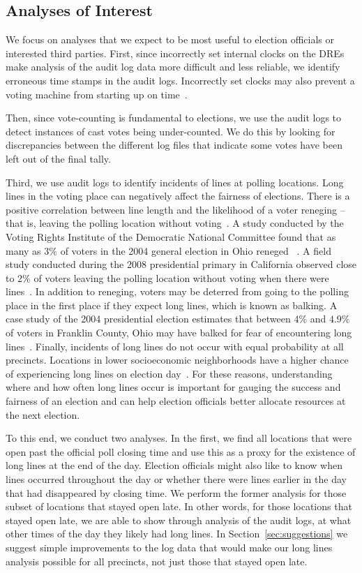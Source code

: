 \documentclass[letterpaper,twocolumn,10pt]{article}
\begin{document}
\subsection{Analyses of Interest}
We focus on analyses that we expect to be most useful to election officials or
interested third parties. First, since incorrectly set internal clocks on the
DREs make analysis of the audit log data more difficult and less reliable, we
identify erroneous time stamps in the audit logs. Incorrectly set
clocks may also prevent a voting machine from starting up on
time~\cite{VotUn2007}.

Then, since vote-counting is fundamental to
elections, we use the audit logs to detect instances of cast votes being
under-counted. We do this by looking for discrepancies between the
different log files that indicate some votes have been left out of the final
tally. 

Third, we use audit logs to identify incidents of lines at polling
locations. Long lines in the voting place can
negatively affect the fairness of elections. There is a positive correlation
between line length and the likelihood of a voter reneging -- that is, leaving
the polling location without voting~\cite{Spencer2010}. A study conducted by the
Voting Rights Institute of the Democratic National Committee found that as many
as $3\%$ of voters in the 2004 general election in Ohio reneged
~\cite{DNC2005}. A field study conducted 
during the 2008 presidential primary in California observed close to $2\%$
of voters leaving the polling location without voting when there were
lines~\cite{Spencer2010}. In addition to reneging, voters may be deterred from
going to the polling place in the first place if they expect long lines, which is
known as balking. A case study of the 2004 presidential election estimates that
between $4\%$ and $4.9\%$ of voters in Franklin County, Ohio may have balked for
fear of encountering long lines~\cite{Allen2006}. Finally, incidents of long
lines do not occur with equal probability at all precincts. Locations in lower
socioeconomic neighborhoods have a higher chance of experiencing long lines on
election day~\cite{Spencer2010,DNC2005}. For these reasons, understanding where  
and how often long lines occur is important for gauging the success and fairness
of an election and can help election officials better allocate resources at the
next election. 

To this end, we conduct two analyses. In the first, we find all
locations that were open past the official poll closing time and use this as a
proxy for the existence of long lines at the end of the day. Election officials
might also like to know when lines occurred throughout the day or whether there
were lines earlier in the day that had disappeared by closing time. We perform
the former 
analysis for those subset of locations that stayed open late. In other words,
for those locations that stayed open late, we are able to show through analysis
of the audit logs, at what other times of the day they likely had long
lines. In Section~\ref{sec:suggestions} we suggest simple improvements to the log
data that would make our long lines analysis possible for all precincts, not
just those that stayed open late.
\end{document}
